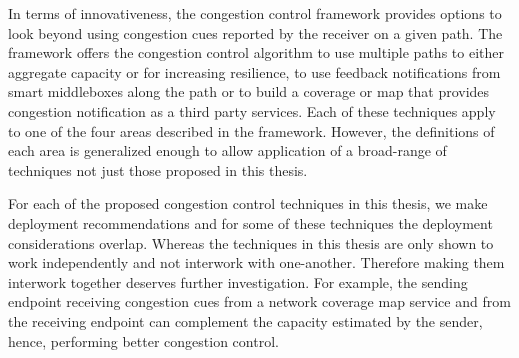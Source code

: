 
In terms of innovativeness, the congestion control framework provides options
to look beyond using congestion cues reported by the receiver on a given path.
The framework offers the congestion control algorithm to use multiple paths to
either aggregate capacity or for increasing resilience, to use feedback
notifications from smart middleboxes along the path or to build a coverage or
map that provides congestion notification as a third party services. Each of
these techniques apply to one of the four areas described in the framework.
However, the definitions of each area is generalized enough to allow
application of a broad-range of techniques not just those proposed in this
thesis.



For each of the proposed congestion control techniques in this thesis, we make
deployment recommendations and for some of these techniques the deployment
considerations overlap. Whereas the techniques in this thesis are only shown
to work independently and not interwork with one-another. Therefore making
them interwork together deserves further investigation. For example, the
sending endpoint receiving congestion cues from a network coverage map service
and from the receiving endpoint can complement the capacity estimated by the
sender, hence, performing better congestion control.

